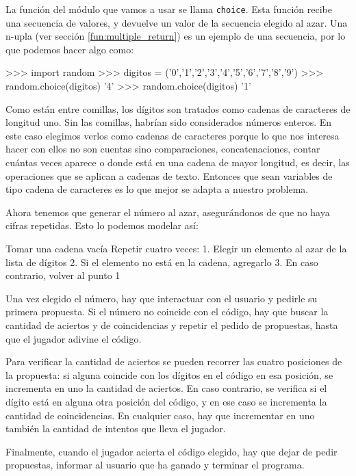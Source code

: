 \begin{enumerate}
La función del módulo que vamos a usar se llama \lstinline!choice!. Esta función
recibe una secuencia de valores, y devuelve un valor de la secuencia elegido al
azar. Una n-upla (ver sección \ref{fun:multiple_return}) es un ejemplo de una
secuencia, por lo que podemos hacer algo como:

\begin{codigo-python-sn}
>>> import random
>>> digitos = ('0','1','2','3','4','5','6','7','8','9')
>>> random.choice(digitos)
'4'
>>> random.choice(digitos)
'1'
\end{codigo-python-sn}

Como están entre comillas, los dígitos son tratados como cadenas de caracteres
de longitud uno. Sin las comillas, habrían sido considerados números enteros. En
este caso elegimos verlos como cadenas de caracteres porque lo que nos interesa
hacer con ellos no son cuentas sino comparaciones, concatenaciones, contar
cuántas veces aparece o donde está en una cadena de mayor longitud, es decir,
las operaciones que se aplican a cadenas de texto. Entonces que sean
variables de tipo cadena de caracteres es lo que mejor se adapta a nuestro
problema.

Ahora tenemos que generar el número al azar, asegurándonos de que no haya cifras
repetidas. Esto lo podemos modelar así:

\begin{codigo-nohl-sn}
Tomar una cadena vacía
Repetir cuatro veces:
    1. Elegir un elemento al azar de la lista de dígitos
    2. Si el elemento no está en la cadena, agregarlo
    3. En caso contrario, volver al punto 1
\end{codigo-nohl-sn}

Una vez elegido el número, hay que interactuar con el usuario y pedirle su
primera propuesta. Si el número no coincide con el código, hay que buscar la
cantidad de aciertos y de coincidencias y repetir el pedido de propuestas, hasta
que el jugador adivine el código.

Para verificar la cantidad de aciertos se pueden recorrer las cuatro posiciones
de la propuesta: si alguna coincide con los dígitos en el código en esa
posición, se incrementa en uno la cantidad de aciertos. En caso contrario, se
verifica si el dígito está en alguna otra posición del código, y en ese caso se
incrementa la cantidad de coincidencias. En cualquier caso, hay que incrementar
en uno también la cantidad de intentos que lleva el jugador.

Finalmente, cuando el jugador acierta el código elegido, hay que dejar de pedir
propuestas, informar al usuario que ha ganado y terminar el programa.


\end{enumerate}
